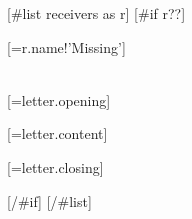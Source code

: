 \documentclass[
    paper=a4,
    foldmarks=pBT,
    firstfoot=false
]{scrlttr2}
\begin{document}
    [#list receivers as r]
        [#if r??]
            \begin{letter}{%
                [=r.name!'Missing']\\
                [=r.addressStreet]\\
                [=r.addressPlace]
            }
                \opening{[=letter.opening]}
                [=letter.content]
                \closing{[=letter.closing]}
            \end{letter}
        [/#if]
    [/#list]
\end{document}
